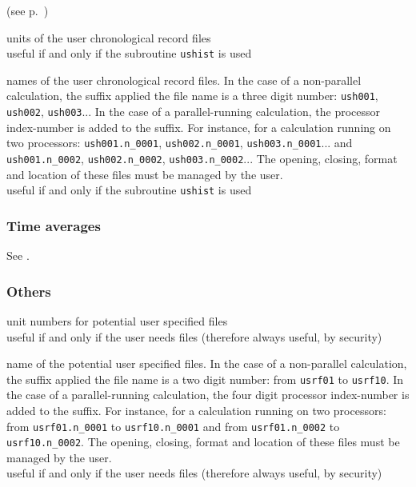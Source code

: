 (see p.~\pageref{sec:prg_ushist})

{units of the user chronological record files\\
useful if and only if the subroutine \texttt{ushist} is used}

{names of the user chronological record files.
In the case of a non-parallel calculation, the suffix applied the file
name is a three digit number: \texttt{ush001}, \texttt{ush002},
\texttt{ush003}...
In the case of a parallel-running calculation, the processor
index-number is added to the suffix. For instance, for a calculation
running on two processors:  \texttt{ush001.n\_0001},
\texttt{ush002.n\_0001}, \texttt{ush003.n\_0001}... and
\texttt{ush001.n\_0002},
\texttt{ush002.n\_0002}, \texttt{ush003.n\_0002}...
The opening, closing, format and location of these files must be managed
by the user.\\
useful if and only if the subroutine \texttt{ushist} is used}

\subsubsection{Time averages}
See .

\subsubsection{Others}

{unit numbers for potential user specified files\\
useful if and only if the user needs files (therefore always useful, by security)}

{name of the potential user specified files. In the case of a non-parallel
calculation, the suffix applied the file name is a two digit number:
from \texttt{usrf01} to \texttt{usrf10}. In the case of a
parallel-running calculation, the four digit processor index-number is
added to the suffix. For instance, for a calculation running on two
processors: from \texttt{usrf01.n\_0001} to \texttt{usrf10.n\_0001} and
from \texttt{usrf01.n\_0002} to \texttt{usrf10.n\_0002}. The opening,
closing, format and location of these files must be managed by the user.\\
useful if and only if the user needs files (therefore always useful, by security)}

